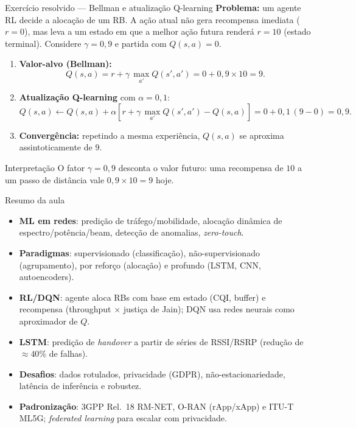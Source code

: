 \documentclass[aspectratio=169,11pt]{beamer}
\begin{document}
\begin{frame}{Exercício resolvido --- Bellman e atualização Q-learning}
  \textbf{Problema:} um agente RL decide a alocação de um RB. A ação atual não gera recompensa imediata ($r = 0$), mas leva a um estado em que a melhor ação futura renderá $r = 10$ (estado terminal). Considere $\gamma = 0{,}9$ e partida com $Q(s,a) = 0$.
  \begin{enumerate}
    \item \textbf{Valor-alvo (Bellman):}
      $$Q(s,a) = r + \gamma\,\max_{a'} Q(s',a') = 0 + 0{,}9 \times 10 = 9.$$
    \item \textbf{Atualização Q-learning} com $\alpha = 0{,}1$:
      $$Q(s,a) \leftarrow Q(s,a) + \alpha\left[ r + \gamma\,\max_{a'} Q(s',a') - Q(s,a) \right] = 0 + 0{,}1\,(9 - 0) = 0{,}9.$$
    \item \textbf{Convergência:} repetindo a mesma experiência, $Q(s,a)$ se aproxima assintoticamente de $9$.
  \end{enumerate}
  \begin{alertblock}{Interpretação}
    O fator $\gamma = 0{,}9$ desconta o valor futuro: uma recompensa de $10$ a um passo de distância vale $0{,}9 \times 10 = 9$ hoje.
  \end{alertblock}
\end{frame}

\begin{frame}{Resumo da aula}
  \begin{itemize}
    \item \textbf{ML em redes}: predição de tráfego/mobilidade, alocação dinâmica de espectro/potência/beam, detecção de anomalias, \emph{zero-touch}.
    \item \textbf{Paradigmas}: supervisionado (classificação), não-supervisionado (agrupamento), por reforço (alocação) e profundo (LSTM, CNN, autoencoders).
    \item \textbf{RL/DQN}: agente aloca RBs com base em estado (CQI, buffer) e recompensa (throughput $\times$ justiça de Jain); DQN usa redes neurais como aproximador de $Q$.
    \item \textbf{LSTM}: predição de \emph{handover} a partir de séries de RSSI/RSRP (redução de $\approx 40\%$ de falhas).
    \item \textbf{Desafios}: dados rotulados, privacidade (GDPR), não-estacionariedade, latência de inferência e robustez.
    \item \textbf{Padronização}: 3GPP Rel.~18 RM-NET, O-RAN (rApp/xApp) e ITU-T ML5G; \emph{federated learning} para escalar com privacidade.
  \end{itemize}
\end{frame}
\end{document}
